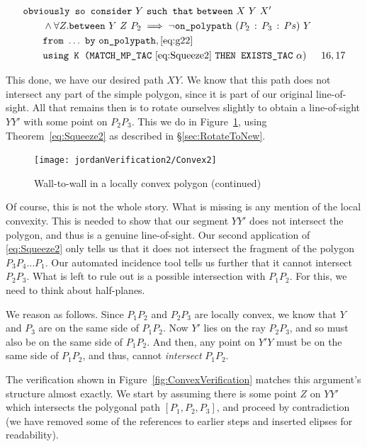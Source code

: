 \begin{align*}
\small
&\code{obviously so consider}\ Y\ \code{such that}\ \between{X}{Y}{X'}\\
&\qquad\wedge \forall Z. \between{Y}{Z}{P_2} \implies \neg\code{on\_polypath}\ (\cons{P_2}{\cons{P_3}{Ps}})\ Y\\ &\qquad\code{from}\ \ldots\ \code{by}\ \code{on\_polypath},\eqref{eq:g22}\\
&\qquad\code{using K (MATCH\_MP\_TAC}\ \eqref{eq:Squeeze2}\ \code{THEN EXISTS\_TAC}\ \alpha) & 16,17
\end{align*}

This done, we have our desired path $XY$. We know that this path does not intersect any part of the simple polygon, since it is part of our original line-of-sight. All that remains then is to rotate ourselves slightly to obtain a line-of-sight $YY'$ with some point on $P_2P_3$. This we do in Figure~\ref{fig:Convex2}, using Theorem~\ref{eq:Squeeze2} as described in \S\ref{sec:RotateToNew}. 

\begin{figure}
\centering\texttt{[image: jordanVerification2/Convex2]}
\caption{Wall-to-wall in a locally convex polygon (continued)}
\label{fig:Convex2}
\end{figure}

Of course, this is not the whole story. What is missing is any mention of the local convexity. This is needed to show that our segment $YY'$ does not intersect the polygon, and thus is a genuine line-of-sight. Our second application of \eqref{eq:Squeeze2} only tells us that it does not intersect the fragment of the polygon $P_3P_4\ldots P_1$. Our automated incidence tool tells us further that it cannot intersect $P_2P_3$. What is left to rule out is a possible intersection with $P_1P_2$. For this, we need to think about half-planes. 

We reason as follows. Since $P_1P_2$ and $P_2P_3$ are locally convex, we know that $Y$ and $P_3$ are on the same side of $P_1P_2$. Now $Y'$ lies on the ray $P_2P_3$, and so must also be on the same side of $P_1P_2$. And then, any point on $Y'Y$ must be on the same side of $P_1P_2$, and thus, cannot \emph{intersect} $P_1P_2$.

The verification shown in Figure~\ref{fig:ConvexVerification} matches this argument's structure almost exactly.  We start by assuming there is some point $Z$ on $YY'$ which intersects the polygonal path $[P_1,P_2,P_3]$, and proceed by contradiction (we have removed some of the references to earlier steps and inserted elipses for readability). 

